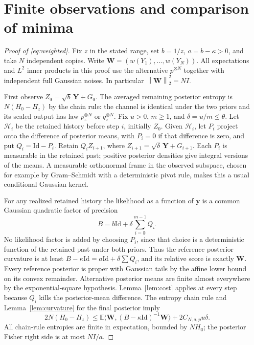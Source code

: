 \documentclass[11pt]{article}
\theoremstyle{remark}\newtheorem{remark}[theorem]{Remark}
\newcommand{\E}{\mathbb E}
\newcommand{\Id}{\mathrm{Id}}
\newcommand{\norm}[1]{\left\lVert #1\right\rVert}
\begin{document}
\section{Finite observations and comparison of minima}
\begin{proof}[Proof of \eqref{eq:weighted}]
Fix $z$ in the stated range, set $b=1/z$, $a=b-\kappa>0$, and take $N$
independent copies. Write $\mathbf W=(w(Y_1),\ldots,w(Y_N))$.
All expectations and $L^2$ inner products in this proof use the alternative
$p^{\otimes N}$ together with independent full Gaussian noises.
In particular $\norm{\mathbf W}_2^2=NI$.

First observe $Z_0=\sqrt b\,\mathbf Y+G_0$.
The averaged remaining posterior entropy is $N(H_0-H_z)$ by the chain rule:
the channel is identical under the two priors and its scaled output
has law $p_z^{\otimes N}$ or $q_z^{\otimes N}$.
Fix $u>0$, $m\ge1$, and $\delta=u/m\le\theta$.
Let $\mathcal H_i$ be the retained history before step $i$, initially $Z_0$.
Given $\mathcal H_i$, let $P_i$ project onto the difference of posterior means,
with $P_i=0$ if that difference is zero, and put $Q_i=\Id-P_i$.
Retain $Q_iZ_{i+1}$, where $Z_{i+1}=\sqrt\delta\,\mathbf Y+G_{i+1}$.
Each $P_i$ is measurable in the retained past; positive posterior densities
give integral versions of the means. A measurable orthonormal frame in the
observed subspace, chosen for example by Gram--Schmidt with a deterministic
pivot rule, makes this a usual conditional Gaussian kernel.

For any realized retained history the likelihood as a function of $\mathbf y$
is a common Gaussian quadratic factor of precision
\[
B=b\Id+\delta\sum_{i=0}^{m-1}Q_i.
\]
No likelihood factor is added by choosing $P_i$, since that choice is a
deterministic function of the retained past under both priors.
Thus the reference posterior curvature is at least
$B-\kappa\Id=a\Id+\delta\sum Q_i$, and its relative score is exactly
$\mathbf W$. Every reference posterior is proper with Gaussian tails
by the affine lower bound on its convex remainder. Alternative posterior
means are finite almost everywhere by the exponential-square hypothesis.
Lemma~\ref{lem:cost} applies at every step because $Q_i$ kills the
posterior-mean difference. The entropy chain rule and Lemma~\ref{lem:curvature}
for the final posterior imply
\begin{equation}\label{eq:posterior}
2N(H_0-H_z)\le
\E\langle\mathbf W,(B-\kappa\Id)^{-1}\mathbf W\rangle
+2C_{N,a,p}u\delta.
\end{equation}
All chain-rule entropies are finite in expectation, bounded by $NH_0$;
the posterior Fisher right side is at most $NI/a$.


\end{proof}
\end{document}
